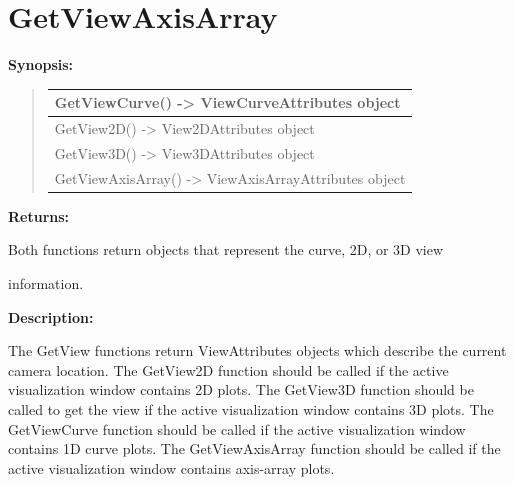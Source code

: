 \documentclass[letterpaper,10pt,english]{sphinxmanual}
\begin{document}
\section{GetViewAxisArray}
\label{functions:getviewaxisarray}
\begin{DUlineblock}{0em}
\item[] \textbf{Synopsis:}
\end{DUlineblock}
\begin{quote}

\begin{tabulary}{\linewidth}{|L|}
\hline

GetViewCurve() -\textgreater{} ViewCurveAttributes object
\\
\hline
GetView2D() -\textgreater{} View2DAttributes object
\\
\hline
GetView3D() -\textgreater{} View3DAttributes object
\\
\hline
GetViewAxisArray() -\textgreater{} ViewAxisArrayAttributes object
\\
\hline\end{tabulary}

\end{quote}

\begin{DUlineblock}{0em}
\item[] 
\item[] \textbf{Returns:}
\item[] Both functions return objects that represent the curve, 2D, or 3D view
\item[] information.
\item[] 
\item[] \textbf{Description:}
\item[] The GetView functions return ViewAttributes objects which describe the
current camera location. The GetView2D function should be called if the
active visualization window contains 2D plots. The GetView3D function
should be called to get the view if the active visualization window
contains 3D plots. The GetViewCurve function should be called if the active
visualization window contains 1D curve plots.  The GetViewAxisArray
function should be called if the active visualization window contains
axis-array plots.
\end{DUlineblock}

\begin{DUlineblock}{0em}
\item[] 
\end{DUlineblock}
\end{document}

